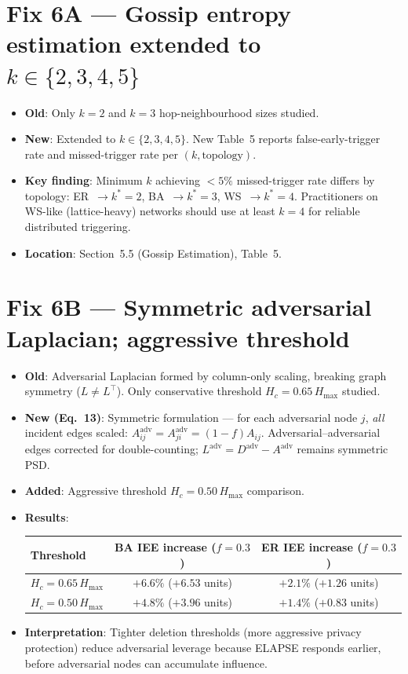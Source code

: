 \documentclass[11pt,a4paper]{article}
\begin{document}
\section*{Fix 6A — Gossip entropy estimation extended to $k \in \{2,3,4,5\}$}

\begin{itemize}
\item \textbf{Old}: Only $k=2$ and $k=3$ hop-neighbourhood sizes studied.
\item \textbf{New}: Extended to $k \in \{2,3,4,5\}$.  New Table~5 reports
  false-early-trigger rate and missed-trigger rate per $(k, \text{topology})$.
\item \textbf{Key finding}: Minimum $k$ achieving $<5\%$ missed-trigger rate
  differs by topology: ER~$\to k^*=2$, BA~$\to k^*=3$, WS~$\to k^*=4$.
  Practitioners on WS-like (lattice-heavy) networks should use at least
  $k=4$ for reliable distributed triggering.
\item \textbf{Location}: Section~5.5 (Gossip Estimation), Table~5.
\end{itemize}

\section*{Fix 6B — Symmetric adversarial Laplacian; aggressive threshold}

\begin{itemize}
\item \textbf{Old}: Adversarial Laplacian formed by column-only scaling,
  breaking graph symmetry ($L \neq L^\top$).  Only conservative threshold
  $H_c = 0.65\,H_{\max}$ studied.
\item \textbf{New (Eq.~13)}: Symmetric formulation — for each adversarial
  node $j$, \emph{all} incident edges scaled: $A^{\mathrm{adv}}_{ij}
  = A^{\mathrm{adv}}_{ji} = (1-f)A_{ij}$.  Adversarial–adversarial edges
  corrected for double-counting; $L^{\mathrm{adv}} = D^{\mathrm{adv}}
  - A^{\mathrm{adv}}$ remains symmetric PSD.
\item \textbf{Added}: Aggressive threshold $H_c = 0.50\,H_{\max}$ comparison.
\item \textbf{Results}:
  \begin{center}
  \begin{tabular}{lcc}
  \toprule
  Threshold & BA IEE increase ($f{=}0.3$) & ER IEE increase ($f{=}0.3$) \\
  \midrule
  $H_c = 0.65\,H_{\max}$ & $+6.6\%$ ($+6.53$ units) & $+2.1\%$ ($+1.26$ units) \\
  $H_c = 0.50\,H_{\max}$ & $+4.8\%$ ($+3.96$ units) & $+1.4\%$ ($+0.83$ units) \\
  \bottomrule
  \end{tabular}
  \end{center}
\item \textbf{Interpretation}: Tighter deletion thresholds (more aggressive
  privacy protection) reduce adversarial leverage because ELAPSE responds
  earlier, before adversarial nodes can accumulate influence.
\end{itemize}
\end{document}
